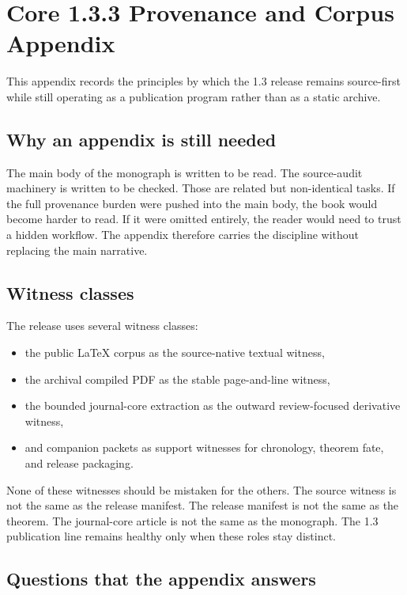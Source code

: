 \section{Core 1.3.3 Provenance and Corpus Appendix}
\label{sec:oc13-source-audit-appendix}

This appendix records the principles by which the 1.3 release remains source-first while still
operating as a publication program rather than as a static archive.

\subsection{Why an appendix is still needed}

The main body of the monograph is written to be read.
The source-audit machinery is written to be checked.
Those are related but non-identical tasks.
If the full provenance burden were pushed into the main body, the book would become harder to read.
If it were omitted entirely, the reader would need to trust a hidden workflow.
The appendix therefore carries the discipline without replacing the main narrative.

\subsection{Witness classes}

The release uses several witness classes:

\begin{itemize}
\item the public LaTeX corpus as the source-native textual witness,
\item the archival compiled PDF as the stable page-and-line witness,
\item the bounded journal-core extraction as the outward review-focused derivative witness,
\item and companion packets as support witnesses for chronology, theorem fate, and release
      packaging.
\end{itemize}

None of these witnesses should be mistaken for the others.
The source witness is not the same as the release manifest.
The release manifest is not the same as the theorem.
The journal-core article is not the same as the monograph.
The 1.3 publication line remains healthy only when these roles stay distinct.

\subsection{Questions that the appendix answers}

